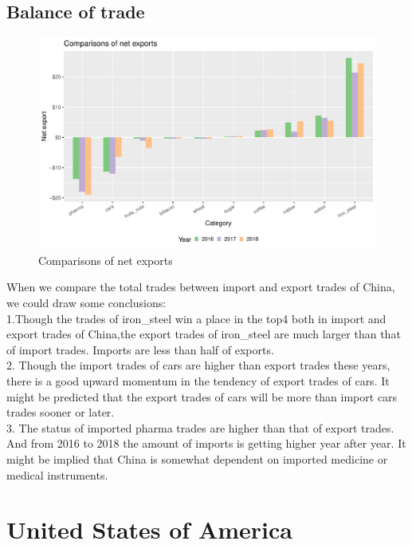 \documentclass[11pt,a4paper,]{article}
\begin{document}
\hypertarget{balance-of-trade}{%
\subsection{Balance of trade}\label{balance-of-trade}}

\begin{figure}[H]
\includegraphics[width=1\linewidth,]{report_files/figure-latex/Yuweiplot3-1} \caption{Comparisons of net exports}\label{fig:Yuweiplot3}
\end{figure}

When we compare the total trades between import and export trades of China, we could draw some conclusions:\\
1.Though the trades of iron\_steel win a place in the top4 both in import and export trades of China,the export trades of iron\_steel are much larger than that of import trades. Imports are less than half of exports.\\
2. Though the import trades of cars are higher than export trades these years, there is a good upward momentum in the tendency of export trades of cars. It might be predicted that the export trades of cars will be more than import cars trades sooner or later.\\
3. The status of imported pharma trades are higher than that of export trades. And from 2016 to 2018 the amount of imports is getting higher year after year. It might be implied that China is somewhat dependent on imported medicine or medical instruments.

\section*{United States of America}
\end{document}
